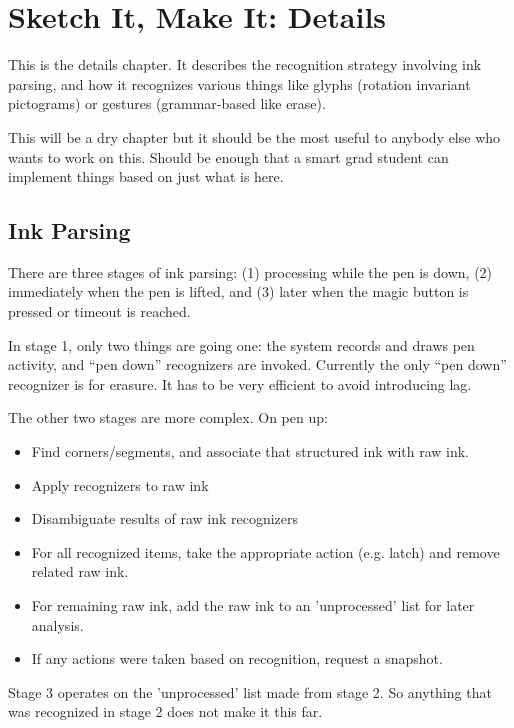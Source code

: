 \chapter{Sketch It, Make It: Details}

This is the details chapter. It describes the recognition strategy
involving ink parsing, and how it recognizes various things like
glyphs (rotation invariant pictograms) or gestures (grammar-based like
erase).

This will be a dry chapter but it should be the most useful to anybody
else who wants to work on this. Should be enough that a smart grad
student can implement things based on just what is here.

\section{Ink Parsing}

There are three stages of ink parsing: (1) processing while the pen is
down, (2) immediately when the pen is lifted, and (3) later when the
magic button is pressed or timeout is reached.

In stage 1, only two things are going one: the system records and
draws pen activity, and ``pen down'' recognizers are
invoked. Currently the only ``pen down'' recognizer is for erasure. It
has to be very efficient to avoid introducing lag.

The other two stages are more complex. On pen up:

\begin{itemize}
\item Find corners/segments, and associate that structured ink with raw ink. 
\item Apply recognizers to raw ink
\item Disambiguate results of raw ink recognizers
\item For all recognized items, take the appropriate action
  (e.g. latch) and remove related raw ink.
\item For remaining raw ink, add the raw ink to an 'unprocessed' list
  for later analysis.
\item If any actions were taken based on recognition, request a
  snapshot.
\end{itemize}

Stage 3 operates on the 'unprocessed' list made from stage 2. So
anything that was recognized in stage 2 does not make it this far.

